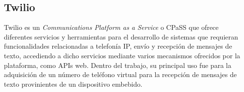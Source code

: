 \subsection{Twilio}

Twilio es un \textit{Communications Platform as a Service} o CPaSS que ofrece diferentes servicios y herramientas para el desarrollo de sistemas que requieran funcionalidades relacionadas a telefonía IP, envío y recepción de mensajes de texto, accediendo a dicho servicios mediante varios mecanismos ofrecidos por la plataforma, como APIs web\citep{TWILIO:1}. Dentro del trabajo, su principal uso fue para la adquisición de un número de teléfono virtual para la recepción de mensajes de texto provinientes de un dispositivo embebido.
